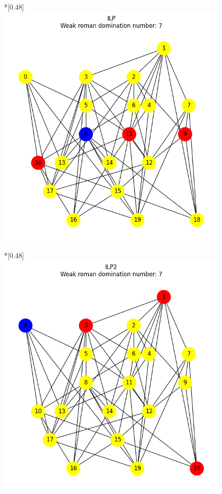     \begin{figure}[htbp]
        \centering
        \begin{subcaptionbox}*{}[0.48\linewidth]
            {\includegraphics[width=0.75\linewidth]{assets/plots/ILP/ErdosRenyi_sparse_n20_i2_results.png}}
        \end{subcaptionbox}
        \hfill
        \begin{subcaptionbox}*{}[0.48\linewidth]
            {\includegraphics[width=0.75\linewidth]{assets/plots/ILP2/ErdosRenyi_sparse_n20_i2_results.png}}
        \end{subcaptionbox}

\end{figure}
